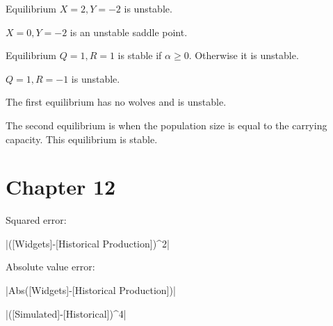\documentclass[]{memoir}
\newcommand{\DecValTok}[1]{\textcolor[rgb]{0.25,0.63,0.44}{{#1}}}
\newcommand{\FunctionTok}[1]{\textcolor[rgb]{0.02,0.16,0.49}{{#1}}}
\newcommand{\NormalTok}[1]{{#1}}
\begin{document}

Equilibrium $X=2, Y=-2$ is unstable.

$X=0, Y=-2$ is an unstable saddle point.


Equilibrium $Q=1, R=1$ is stable if $\alpha \geq 0$. Otherwise it is
unstable.

$Q=1, R=-1$ is unstable.


The first equilibrium has no wolves and is unstable.

The second equilibrium is when the population size is equal to the
carrying capacity. This equilibrium is stable.

\section{Chapter 12}


Squared error:

|\NormalTok{([Widgets]-[Historical Production])^}\DecValTok{2}|

Absolute value error:

|\FunctionTok{Abs}\NormalTok{([Widgets]-[Historical Production])}|


|\NormalTok{([Simulated]-[Historical])^}\DecValTok{4}|
\end{document}
